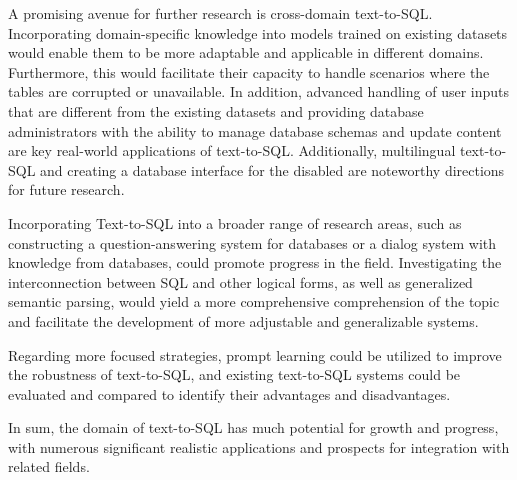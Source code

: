 A promising avenue for further research is cross-domain text-to-SQL. Incorporating domain-specific knowledge into models trained on existing datasets would enable them to be more adaptable and applicable in different domains. Furthermore, this would facilitate their capacity to handle scenarios where the tables are corrupted or unavailable. In addition, advanced handling of user inputs that are different from the existing datasets and providing database administrators with the ability to manage database schemas and update content are key real-world applications of text-to-SQL. Additionally, multilingual text-to-SQL and creating a database interface for the disabled are noteworthy directions for future research.

Incorporating Text-to-SQL into a broader range of research areas, such as constructing a question-answering system for databases or a dialog system with knowledge from databases, could promote progress in the field. Investigating the interconnection between SQL and other logical forms, as well as generalized semantic parsing, would yield a more comprehensive comprehension of the topic and facilitate the development of more adjustable and generalizable systems.

Regarding more focused strategies, prompt learning could be utilized to improve the robustness of text-to-SQL, and existing text-to-SQL systems could be evaluated and compared to identify their advantages and disadvantages.

In sum, the domain of text-to-SQL has much potential for growth and progress, with numerous significant realistic applications and prospects for integration with related fields.